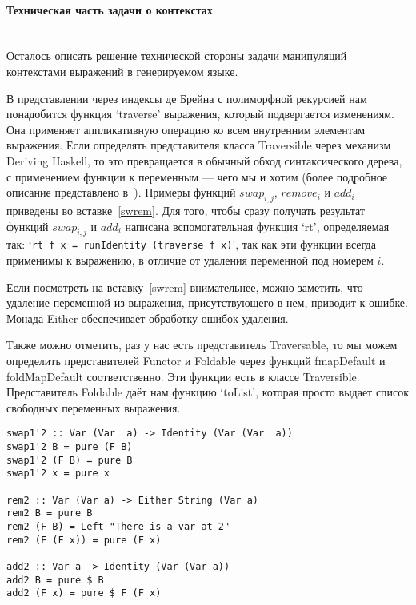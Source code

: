 \paragraph{Техническая часть задачи о контекстах} \hspace{0pt} \\

Осталось описать решение технической стороны задачи манипуляций контекстами выражений в генерируемом языке.

В представлении через индексы де Брейна с полиморфной рекурсией нам понадобится функция `traverse' выражения, который подвергается изменениям. Она применяет аппликативную операцию ко всем внутренним элементам выражения. Если определять представителя класса Traversible через механизм Deriving Haskell\cite{deriveFun}, то это превращается в обычный обход синтаксического дерева, с применением функции к переменным --- чего мы и хотим (более подробное описание представлено в~\cite{bound}). Примеры функций $swap_{i,j}$, $remove_i$ и $add_i$ приведены во вставке~\ref{swrem}. Для того, чтобы сразу получать результат функций $swap_{i,j}$ и $add_i$ написана вспомогательная функция `rt', определяемая так: `\lstinline{rt f x = runIdentity (traverse f x)}', так как эти функции всегда применимы к выражению, в отличие от удаления переменной под номерем $i$.

Если посмотреть на вставку~\ref{swrem} внимательнее, можно заметить, что удаление переменной из выражения, присутствующего в нем, приводит к ошибке. Монада Either обеспечивает обработку ошибок удаления.

Также можно отметить, раз у нас есть представитель Traversable, то мы можем определить представителей Functor и Foldable через функций fmapDefault и foldMapDefault соответственно. Эти функции есть в классе Traversible. Представитель Foldable даёт нам функцию `toList', которая просто выдает список свободных переменных выражения.

\begin{lstlisting}[label={swrem}, caption={Примеры функций $swap_{i,j}$, $remove_i$ и $add_i$},captionpos=b, frame=single, float, floatplacement=H]
swap1'2 :: Var (Var  a) -> Identity (Var (Var  a))
swap1'2 B = pure (F B)
swap1'2 (F B) = pure B
swap1'2 x = pure x

rem2 :: Var (Var a) -> Either String (Var a)
rem2 B = pure B
rem2 (F B) = Left "There is a var at 2"
rem2 (F (F x)) = pure (F x)

add2 :: Var a -> Identity (Var (Var a))
add2 B = pure $ B
add2 (F x) = pure $ F (F x)
\end{lstlisting}







